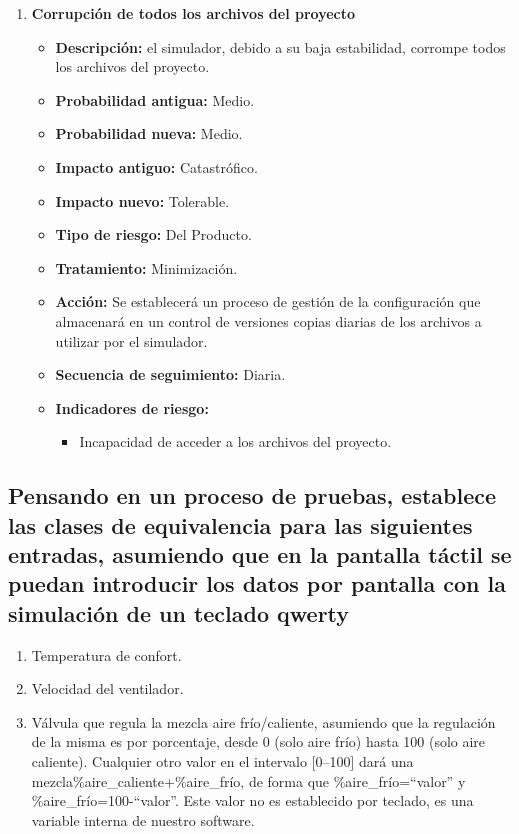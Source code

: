 \begin{enumerate}
    \item \textbf{Corrupción de todos los archivos del proyecto}
    \begin{itemize}
    \item \textbf{Descripción:} el simulador, debido a su baja estabilidad, corrompe todos los archivos del proyecto.
    \item \textbf{Probabilidad antigua:} Medio.
    \item \textbf{Probabilidad nueva:} Medio.
    \item \textbf{Impacto antiguo:} Catastrófico.
    \item \textbf{Impacto nuevo:} Tolerable.
    \item \textbf{Tipo de riesgo:} Del Producto.
    \item \textbf{Tratamiento:} Minimización.
    \item \textbf{Acción:} Se establecerá un proceso de gestión de la configuración que almacenará en un control de versiones copias diarias de los archivos a utilizar por el simulador.
    \item \textbf{Secuencia de seguimiento:} Diaria.
    \item \textbf{Indicadores de riesgo:}
    \begin{itemize}
        \item Incapacidad de acceder a los archivos del proyecto.
    \end{itemize}
    \end{itemize}
\end{enumerate}


\subsection{Pensando en un proceso de pruebas, establece las clases de equivalencia para las siguientes entradas, asumiendo que en la pantalla táctil se puedan introducir los datos por pantalla con la simulación de un teclado qwerty}
\begin{enumerate}
    \item Temperatura de confort.
    \item Velocidad del ventilador.
    \item Válvula que regula la mezcla aire frío/caliente, asumiendo que la regulación de la misma es por porcentaje, desde 0 (solo aire frío) hasta 100 (solo aire caliente). Cualquier otro valor en el intervalo [0--100] dará una mezcla\%aire\_caliente+\%aire\_frío, de forma que \%aire\_frío=``valor'' y \%aire\_frío=100-``valor''. Este valor no es establecido por teclado, es una variable interna de nuestro software.
\end{enumerate}

